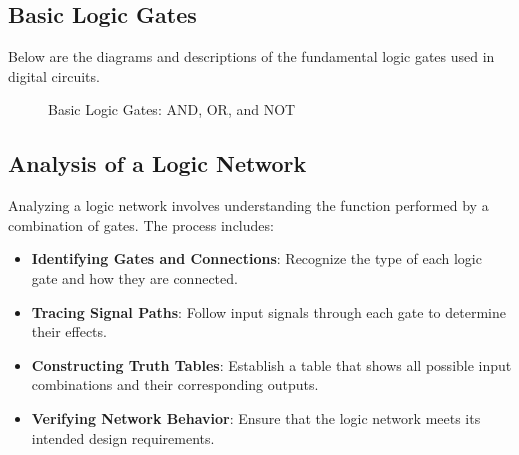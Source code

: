 \documentclass{article}
\begin{document}
\subsection{Basic Logic Gates}
Below are the diagrams and descriptions of the fundamental logic gates used in digital circuits.

\begin{figure}[ht]
    \centering
    \caption{Basic Logic Gates: AND, OR, and NOT}
\end{figure}
\pagebreak

\subsection{Analysis of a Logic Network}
Analyzing a logic network involves understanding the function performed by a combination of gates. The process includes:
\begin{itemize}
    \item \textbf{Identifying Gates and Connections}: Recognize the type of each logic gate and how they are connected.
    \item \textbf{Tracing Signal Paths}: Follow input signals through each gate to determine their effects.
    \item \textbf{Constructing Truth Tables}: Establish a table that shows all possible input combinations and their corresponding outputs.
    \item \textbf{Verifying Network Behavior}: Ensure that the logic network meets its intended design requirements.
\end{itemize}
\end{document}
